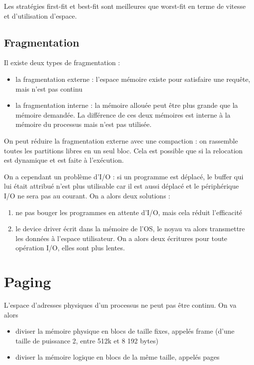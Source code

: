 	Les stratégies first-fit et best-fit sont meilleures que worst-fit en terme de vitesse et d'utilisation d'espace.
	
	\subsection{Fragmentation}
	
	Il existe deux types de fragmentation :
	
	\begin{itemize}
		\item la fragmentation externe : l'espace mémoire existe pour satisfaire une requête, mais n'est pas continu
		\item la fragmentation interne : la mémoire allouée peut être plus grande que la mémoire demandée. La différence de ces deux mémoires est interne à la mémoire du processus mais n'est pas utilisée.
	\end{itemize}
	
	On peut réduire la fragmentation externe avec une compaction : on rassemble toutes les partitions libres en un seul bloc. Cela est possible que si la relocation est dynamique et est faite à l'exécution.
	
	On a cependant un problème d'I/O : si un programme est déplacé, le buffer qui lui était attribué n'est plus utilisable car il est aussi déplacé et le périphérique I/O ne sera pas au courant. On a alors deux solutions :
	
	\begin{enumerate}
		\item ne pas bouger les programmes en attente d'I/O, mais cela réduit l'efficacité
		\item le device driver écrit dans la mémoire de l'OS, le noyau va alors transmettre les données à l'espace utilisateur. On a alors deux écritures pour toute opération I/O, elles sont plus lentes.
	\end{enumerate}
	
\section{Paging}

L'espace d'adresses physiques d'un processus ne peut pas être continu. On va alors 

\begin{itemize}
	\item diviser la mémoire physique en blocs de taille fixes, appelés frame (d'une taille de puissance 2, entre 512k et 8 192 bytes)
	\item diviser la mémoire logique en blocs de la même taille, appelés pages
\end{itemize}

